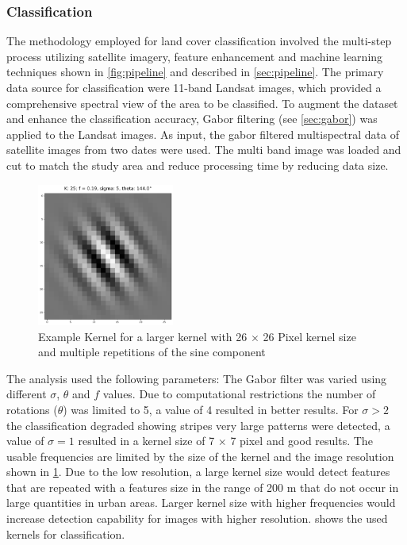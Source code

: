\documentclass[12pt,a4paper, english,twoside]{article}
\begin{document}
    \subsubsection{Classification }\label{sec:classification}
      The methodology employed for land cover classification involved the multi-step process utilizing satellite imagery, feature enhancement and machine learning techniques shown in \cref{fig:pipeline} and described in \cref{sec:pipeline}.
      The primary data source for classification were 11-band Landsat images, which provided a comprehensive spectral view of the area to be classified.
      To augment the dataset and enhance the classification accuracy, Gabor filtering (see \cref{sec:gabor}) was applied to the Landsat images.
      As input, the gabor filtered multispectral data of satellite images from two dates were used.
      The multi band image was loaded and cut to match the study area and reduce processing time by reducing data size.  
      \begin{figure}
       \begin{center}
         \includegraphics[width=0.4\textwidth]{img/KLarge.png}
       \end{center}
       \caption{Example Kernel for a larger kernel with 26 $\times$ 26 Pixel kernel size and multiple repetitions of the sine component}\label{fig:largeKernel}
      \end{figure}
    The analysis used the following parameters: 
    The Gabor filter was varied using different $\sigma$, $\theta$ and $f$ values.
    Due to computational restrictions the number of rotations ($\theta$) was limited to 5, a value of 4 resulted in better results. 
    For $\sigma > 2$ the classification degraded showing stripes very large patterns were detected, a value of $\sigma = 1$ resulted in a kernel size of 7 $\times$ 7 pixel and good results.
%
    The usable frequencies are limited by the size of the kernel and the image resolution shown in \cref{fig:largeKernel}.
    Due to the low resolution, a large kernel size would detect features that are repeated with a features size in the range of 200 m that do not occur in large quantities in urban areas. 
    Larger kernel size with higher frequencies would increase detection capability for images with higher resolution. 
     shows the used kernels for classification.
\end{document}
